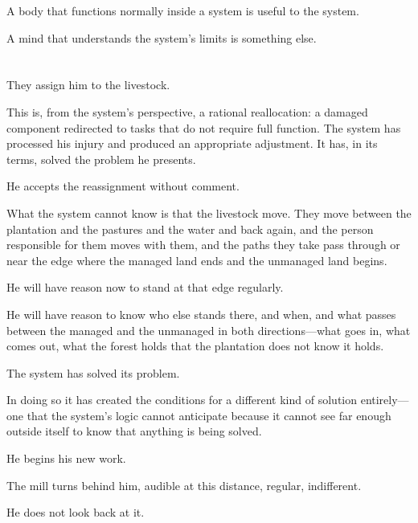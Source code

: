 A body that functions normally inside a system is useful to the
system.

A mind that understands the system's limits is something else.

\section{}

They assign him to the livestock.

This is, from the system's perspective, a rational reallocation:
a damaged component redirected to tasks that do not require full
function. The system has processed his injury and produced an
appropriate adjustment. It has, in its terms, solved the problem
he presents.

He accepts the reassignment without comment.

What the system cannot know is that the livestock move. They move
between the plantation and the pastures and the water and back
again, and the person responsible for them moves with them, and
the paths they take pass through or near the edge where the
managed land ends and the unmanaged land begins.

He will have reason now to stand at that edge regularly.

He will have reason to know who else stands there, and when, and
what passes between the managed and the unmanaged in both
directions---what goes in, what comes out, what the forest holds
that the plantation does not know it holds.

The system has solved its problem.

In doing so it has created the conditions for a different kind
of solution entirely---one that the system's logic cannot
anticipate because it cannot see far enough outside itself to
know that anything is being solved.

He begins his new work.

The mill turns behind him, audible at this distance, regular,
indifferent.

He does not look back at it.

